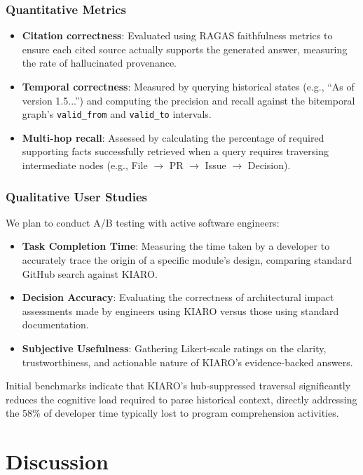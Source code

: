 \documentclass[conference]{IEEEtran}
\begin{document}
\subsubsection{Quantitative Metrics}
\begin{itemize}
    \item \textbf{Citation correctness}: Evaluated using RAGAS faithfulness metrics to ensure each cited source actually supports the generated answer, measuring the rate of hallucinated provenance.
    \item \textbf{Temporal correctness}: Measured by querying historical states (e.g., ``As of version 1.5...'') and computing the precision and recall against the bitemporal graph's \texttt{valid\_from} and \texttt{valid\_to} intervals.
    \item \textbf{Multi-hop recall}: Assessed by calculating the percentage of required supporting facts successfully retrieved when a query requires traversing intermediate nodes (e.g., File $\rightarrow$ PR $\rightarrow$ Issue $\rightarrow$ Decision).
\end{itemize}

\subsubsection{Qualitative User Studies}
We plan to conduct A/B testing with active software engineers:
\begin{itemize}
    \item \textbf{Task Completion Time}: Measuring the time taken by a developer to accurately trace the origin of a specific module's design, comparing standard GitHub search against KIARO.
    \item \textbf{Decision Accuracy}: Evaluating the correctness of architectural impact assessments made by engineers using KIARO versus those using standard documentation.
    \item \textbf{Subjective Usefulness}: Gathering Likert-scale ratings on the clarity, trustworthiness, and actionable nature of KIARO's evidence-backed answers.
\end{itemize}

Initial benchmarks indicate that KIARO's hub-suppressed traversal significantly reduces the cognitive load required to parse historical context, directly addressing the 58\% of developer time typically lost to program comprehension activities.

\section{Discussion}
\label{sec:discussion}
\end{document}
